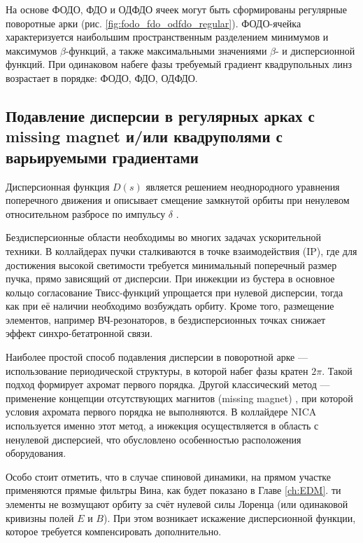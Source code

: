 \par На основе ФОДО, ФДО и ОДФДО ячеек могут быть сформированы регулярные поворотные арки (рис. \ref{fig:fodo_fdo_odfdo_regular}). ФОДО-ячейка характеризуется наибольшим пространственным разделением минимумов и максимумов $\beta$-функций, а также максимальными значениями $\beta$- и дисперсионной функций. При одинаковом набеге фазы требуемый градиент квадрупольных линз возрастает в порядке: ФОДО, ФДО, ОДФДО.

	\subsection{Подавление дисперсии в регулярных арках с missing magnet и/или квадруполями с варьируемыми градиентами}\label{sec:transition_jump/suppression}

\par Дисперсионная функция $D(s)$ является решением неоднородного уравнения поперечного движения и описывает смещение замкнутой орбиты при ненулевом относительном разбросе по импульсу $\delta$ \cite{lee}.

\par Бездисперсионные области необходимы во многих задачах ускорительной техники. В коллайдерах пучки сталкиваются в точке взаимодействия (IP), где для достижения высокой светимости требуется минимальный поперечный размер пучка, прямо зависящий от дисперсии. При инжекции из бустера в основное кольцо согласование Твисс-функций упрощается при нулевой дисперсии, тогда как при её наличии необходимо возбуждать орбиту. Кроме того, размещение элементов, например ВЧ-резонаторов, в бездисперсионных точках снижает эффект синхро-бетатронной связи.

\par Наиболее простой способ подавления дисперсии в поворотной арке — использование периодической структуры, в которой набег фазы кратен $2\pi$. Такой подход формирует ахромат первого порядка. Другой классический метод — применение концепции отсутствующих магнитов (missing magnet) \cite{autin:dispersion}, при которой условия ахромата первого порядка не выполняются. В коллайдере NICA используется именно этот метод, а инжекция осуществляется в область с ненулевой дисперсией, что обусловлено особенностью расположения оборудования.

\par Особо стоит отметить, что в случае спиновой динамики, на прямом участке применяются прямые фильтры Вина, как будет показано в Главе \ref{ch:EDM}. ти элементы не возмущают орбиту за счёт нулевой силы Лоренца (или одинаковой кривизны полей $E$ и $B$). При этом возникает искажение дисперсионной функции, которое требуется компенсировать дополнительно.

